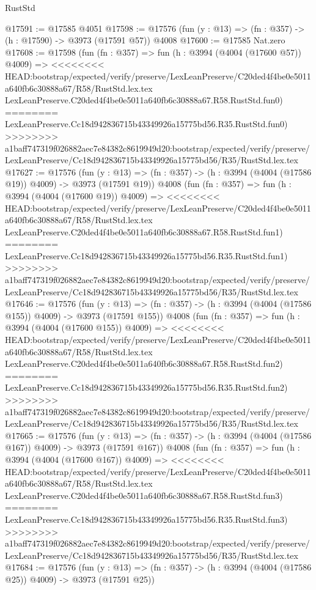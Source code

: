 \begin{lexlean}{RustStd}
\begin{coremodule}
{\begin{coremodule}
{{{{{{{{{{{{{{{{@17591 := @17585 @4051
@17598 := @17576 (fun (y : @13) => (fn : @357) -> (h : @17590) -> @3973 (@17591 @57)) @4008
@17600 := @17585 Nat.zero
@17608 := @17598
    (fun (fn : @357) =>
    fun (h : @3994 (@4004 (@17600 @57)) @4009) =>
<<<<<<<< HEAD:bootstrap/expected/verify/preserve/LexLeanPreserve/C20ded4f4be0e5011a640fb6c30888a67/R58/RustStd.lex.tex
    LexLeanPreserve.C20ded4f4be0e5011a640fb6c30888a67.R58.RustStd.fun0)
========
    LexLeanPreserve.Cc18d942836715b43349926a15775bd56.R35.RustStd.fun0)
>>>>>>>> a1baff747319f026882aec7e84382c8619949d20:bootstrap/expected/verify/preserve/LexLeanPreserve/Cc18d942836715b43349926a15775bd56/R35/RustStd.lex.tex
@17627 := @17576
    (fun (y : @13) => (fn : @357) -> (h : @3994 (@4004 (@17586 @19)) @4009) -> @3973 (@17591 @19))
    @4008
    (fun (fn : @357) =>
    fun (h : @3994 (@4004 (@17600 @19)) @4009) =>
<<<<<<<< HEAD:bootstrap/expected/verify/preserve/LexLeanPreserve/C20ded4f4be0e5011a640fb6c30888a67/R58/RustStd.lex.tex
    LexLeanPreserve.C20ded4f4be0e5011a640fb6c30888a67.R58.RustStd.fun1)
========
    LexLeanPreserve.Cc18d942836715b43349926a15775bd56.R35.RustStd.fun1)
>>>>>>>> a1baff747319f026882aec7e84382c8619949d20:bootstrap/expected/verify/preserve/LexLeanPreserve/Cc18d942836715b43349926a15775bd56/R35/RustStd.lex.tex
@17646 := @17576
    (fun (y : @13) => (fn : @357) -> (h : @3994 (@4004 (@17586 @155)) @4009) -> @3973 (@17591 @155))
    @4008
    (fun (fn : @357) =>
    fun (h : @3994 (@4004 (@17600 @155)) @4009) =>
<<<<<<<< HEAD:bootstrap/expected/verify/preserve/LexLeanPreserve/C20ded4f4be0e5011a640fb6c30888a67/R58/RustStd.lex.tex
    LexLeanPreserve.C20ded4f4be0e5011a640fb6c30888a67.R58.RustStd.fun2)
========
    LexLeanPreserve.Cc18d942836715b43349926a15775bd56.R35.RustStd.fun2)
>>>>>>>> a1baff747319f026882aec7e84382c8619949d20:bootstrap/expected/verify/preserve/LexLeanPreserve/Cc18d942836715b43349926a15775bd56/R35/RustStd.lex.tex
@17665 := @17576
    (fun (y : @13) => (fn : @357) -> (h : @3994 (@4004 (@17586 @167)) @4009) -> @3973 (@17591 @167))
    @4008
    (fun (fn : @357) =>
    fun (h : @3994 (@4004 (@17600 @167)) @4009) =>
<<<<<<<< HEAD:bootstrap/expected/verify/preserve/LexLeanPreserve/C20ded4f4be0e5011a640fb6c30888a67/R58/RustStd.lex.tex
    LexLeanPreserve.C20ded4f4be0e5011a640fb6c30888a67.R58.RustStd.fun3)
========
    LexLeanPreserve.Cc18d942836715b43349926a15775bd56.R35.RustStd.fun3)
>>>>>>>> a1baff747319f026882aec7e84382c8619949d20:bootstrap/expected/verify/preserve/LexLeanPreserve/Cc18d942836715b43349926a15775bd56/R35/RustStd.lex.tex
@17684 := @17576
    (fun (y : @13) => (fn : @357) -> (h : @3994 (@4004 (@17586 @25)) @4009) -> @3973 (@17591 @25))
}}}}}}}}}}}}}}}}
\end{coremodule}}
\end{coremodule}
\end{lexlean}
